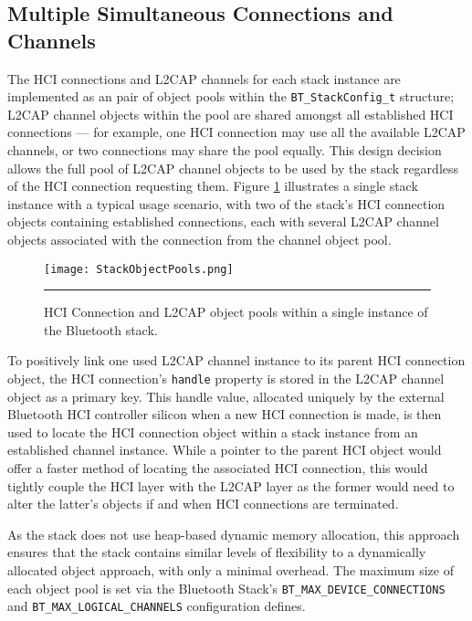 

\subsection{Multiple Simultaneous Connections and Channels}

The HCI connections and L2CAP channels for each stack instance are implemented as an pair of object pools within the \lstinline{BT_StackConfig_t} structure; L2CAP channel objects within the pool are shared amongst all established HCI connections --- for example, one HCI connection may use all the available L2CAP channels, or two connections may share the pool equally. This design decision allows the full pool of L2CAP channel objects to be used by the stack regardless of the HCI connection requesting them. Figure \ref{fig:stackobjectpools} illustrates a single stack instance with a typical usage scenario, with two of the stack's HCI connection objects containing established connections, each with several L2CAP channel objects associated with the connection from the channel object pool.

\begin{figure}[tbph]
	\vspace{1em}
	\centering
		\texttt{[image: StackObjectPools.png]}
	\rule{35em}{0.5pt}
	\caption[Bluetooth stack instance object pools]{HCI Connection and L2CAP object pools within a single instance of the Bluetooth stack.}
	\label{fig:stackobjectpools}
\end{figure}

To positively link one used L2CAP channel instance to its parent HCI connection object, the HCI connection's \lstinline{handle} property is stored in the L2CAP channel object as a primary key. This handle value, allocated uniquely by the external Bluetooth HCI controller silicon when a new HCI connection is made, is then used to locate the HCI connection object within a stack instance from an established channel instance. While a pointer to the parent HCI object would offer a faster method of locating the associated HCI connection, this would tightly couple the HCI layer with the L2CAP layer as the former would need to alter the latter's objects if and when HCI connections are terminated.

As the stack does not use heap-based dynamic memory allocation, this approach ensures that the stack contains similar levels of flexibility to a dynamically allocated object approach, with only a minimal overhead. The maximum size of each object pool is set via the Bluetooth Stack's \lstinline{BT_MAX_DEVICE_CONNECTIONS} and \lstinline{BT_MAX_LOGICAL_CHANNELS} configuration defines.

